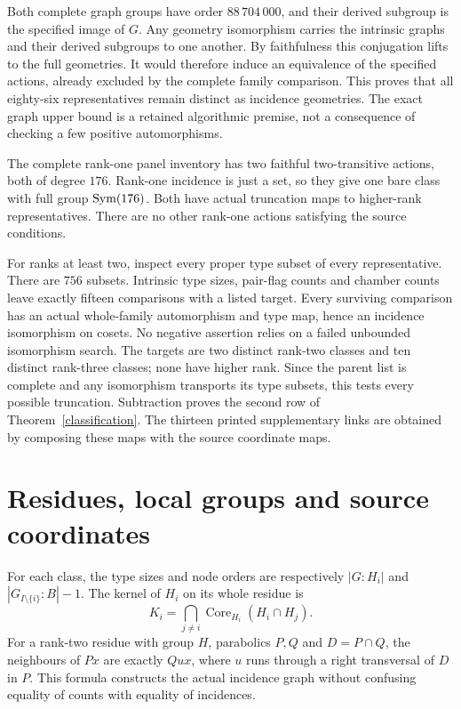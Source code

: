 Both complete graph groups have order $88\,704\,000$, and their derived
subgroup is the specified image of $G$. Any geometry isomorphism carries
the intrinsic graphs and their derived subgroups to one another. By
faithfulness this conjugation lifts to the full geometries. It would
therefore induce an equivalence of the specified actions, already excluded
by the complete family comparison. This proves that all eighty-six
representatives remain distinct as incidence geometries. The exact
graph upper bound is a retained algorithmic premise, not a consequence
of checking a few positive automorphisms.

The complete rank-one panel inventory has two faithful two-transitive
actions, both of degree $176$. Rank-one incidence is just a set, so
they give one bare class with full group $\operatorname{Sym}(176)$. Both have actual
truncation maps to higher-rank representatives. There are no other
rank-one actions satisfying the source conditions.

For ranks at least two, inspect every proper type subset of every
representative. There are $756$ subsets. Intrinsic type sizes, pair-flag
counts and chamber counts leave exactly fifteen comparisons with a
listed target. Every surviving comparison has an actual whole-family
automorphism and type map, hence an incidence isomorphism on cosets.
No negative assertion relies on a failed unbounded isomorphism search.
The targets are two distinct rank-two classes and ten distinct rank-three
classes; none have higher rank. Since the parent list is complete and
any isomorphism transports its type subsets, this tests every possible
truncation. Subtraction proves the second row of
Theorem~\ref{classification}. The thirteen printed supplementary links
are obtained by composing these maps with the source coordinate maps.

\section{Residues, local groups and source coordinates}
For each class, the type sizes and node orders are respectively
$|G:H_i|$ and $|G_{I\setminus\{i\}}:B|-1$. The kernel of $H_i$ on
its whole residue is
\[
 K_i=\bigcap_{j\ne i}\operatorname{Core}_{H_i}(H_i\cap H_j).
\]
For a rank-two residue with group $H$, parabolics $P,Q$ and
$D=P\cap Q$, the neighbours of $Px$ are exactly $Qux$, where $u$
runs through a right transversal of $D$ in $P$. This formula constructs
the actual incidence graph without confusing equality of counts with
equality of incidences.

